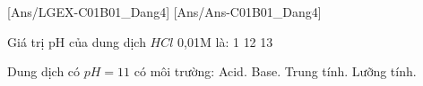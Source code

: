 [Ans/LGEX-C01B01_Dang4]
[Ans/Ans-C01B01_Dang4]
\begin{ex}
	Giá trị pH của dung dịch $HCl$ 0,01M là:
	\choice
	{1}
	{}
	{12}
	{13}
\end{ex}
\begin{ex}
	Dung dịch có $pH = 11$ có môi trường:
	\choice
	{Acid.}
	{\True Base.}
	{Trung tính.}
	{Lưỡng tính.}
\end{ex}
